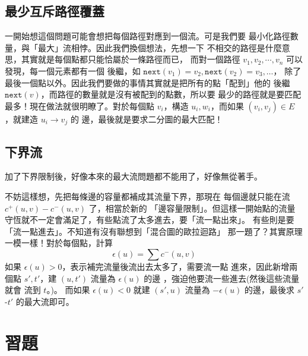 \documentclass[a4paper,12pt]{book}
\begin{document}
\subsection{最少互斥路徑覆蓋}

一開始想這個問題可能會想把每個路徑對應到一個流。可是我們要
最小化路徑數量，與「最大」流相悖。因此我們換個想法，先想一下
不相交的路徑是什麼意思，其實就是每個點都只能恰屬於一條路徑而已，
而對一個路徑 $v_1, v_2, \cdots, v_n$ 可以發現，每一個元素都有一個
後繼，如 $\mathtt{next}(v_1) = v_2, \mathtt{next}(v_2) = v_3, \dots$，
除了最後一個點以外。因此我們要做的事情其實就是把所有的點「配到」他的
後繼 $\mathtt{next}(v)$，而路徑的數量就是沒有被配到的點數，所以要
最少的路徑就是要匹配最多！現在做法就很明瞭了。對於每個點 $v_i$，構造
$u_i, w_i$，而如果 $(v_i, v_j) \in E$ ，就建造 $u_i \rightarrow v_j$ 的
邊，最後就是要求二分圖的最大匹配！

\subsection{下界流}
加了下界限制後，好像本來的最大流問題都不能用了，好像無從著手。

不妨這樣想，先把每條邊的容量都補成其流量下界，那現在
每個邊就只能在流 $c^+(u, v) - c^-(u, v)$ 了，相當於新的
「邊容量限制」。但這樣一開始點的流量
守恆就不一定會滿足了，有些點流了太多進去，要「流一點出來」。
有些則是要「流一點進去」。不知道有沒有聯想到「混合圖的歐拉迴路」
那一題了？其實原理一模一樣！對於每個點，計算
\[ \epsilon(u) = \sum c^-(u, v) \]
如果 $\epsilon(u) > 0$，表示補完流量後流出去太多了，需要流一點
進來，因此新增兩個點 $s', t'$，建 $(u, t')$ 流量為 $\epsilon(u)$ 的邊
，強迫他要流一些進去(然後這些流量就會
流到 $t$。)。 而如果 $\epsilon(u) < 0$ 就建 $(s', u)$ 流量為 $-\epsilon(u)$
的邊，最後求 $s'$-$t'$ 的最大流即可。


\section{習題}

    
\end{document}
